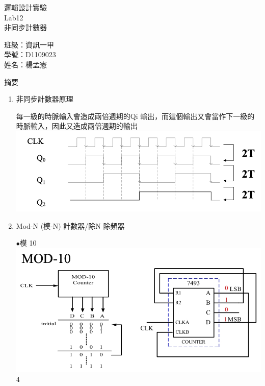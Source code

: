 \documentclass[12pt, a4paper]{article}
\begin{document}
\begin{center}
  {\Huge 邏輯設計實驗} \\[2.5cm]
  {\Huge Lab12} \\[1.5cm]
  {\Huge 非同步計數器} \\ [4.5cm]
  \hspace{.6in}
  \begin{minipage}[t]{.4\linewidth}
    {\Large 班級：資訊一甲}\\[0.5cm]
    {\Large 學號：D1109023}\\[0.5cm]
    {\Large 姓名：楊孟憲}
  \end{minipage}    
\end{center}

\newpage

\begin{description}
  \fontsize{22pt}{25pt}\selectfont 
    \item [一、]摘要 
      \begin{enumerate}
        \fontsize{20pt}{22pt}\selectfont
          \item 非同步計數器原理 \\
            \begin{samepage}
              \fontsize{16pt}{20}\selectfont
              每一級的時脈輸入會造成兩倍週期的Qi 輸出，而這個輸出又會當作下一級的時脈輸入，因此又造成兩倍週期的輸出\\
              \normalsize
              \includegraphics[width=13cm]{./image/截圖 2023-05-21 下午8.26.02.png}
            \end{samepage}

          \item Mod-N (模-N) 計數器/除N 除頻器 \\
            \begin{samepage}
              $\bullet$模 10 \\
              \includegraphics[width=13cm]{./image/n_mod.png}4
              \normalsize
            \end{samepage}
            

\end{enumerate}
\end{description}
\end{document}
